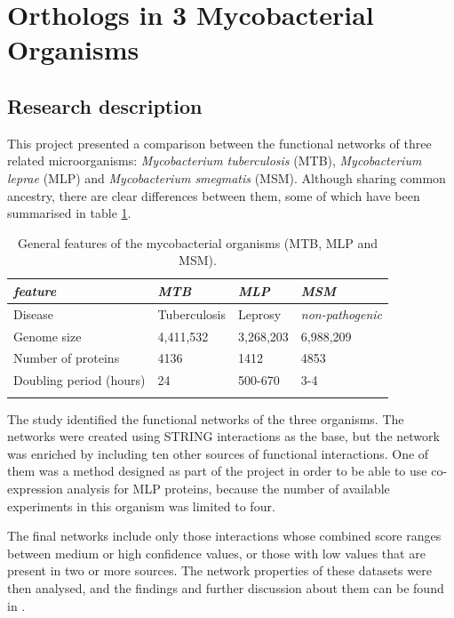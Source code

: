\section{Orthologs in 3 Mycobacterial Organisms}\label{sec:orthologs}
\subsection{Research description}
This project presented a comparison between the functional networks of three related microorganisms: \emph{Mycobacterium tuberculosis} (MTB), \emph{Mycobacterium leprae} (MLP) and \emph{Mycobacterium smegmatis} (MSM). Although sharing common ancestry, there are clear differences between them, some of which have been summarised in table \ref{tab:orthologs}.

\begin{table}[!ht]
\centering
        \begin{tabular}{| l | l | l | l |}
\hline \rowcolor{table_header}
\emph{feature} & \emph{MTB} & \emph{MLP} & \emph{MSM}\\
\hline \rowcolor{row_odd}
Disease & Tuberculosis & Leprosy & \emph{non-pathogenic}\\
\hline \rowcolor{row_even}
Genome size & 4,411,532 & 3,268,203 & 6,988,209\\
\hline \rowcolor{row_odd}
Number of proteins & 4136 & 1412 & 4853\\
\hline \rowcolor{row_even}
Doubling period (hours) & 24  & 500-670 & 3-4 \\
\hline \rowcolor{row_odd}
        \end{tabular}
        \caption{General features of the mycobacterial organisms (MTB, MLP and MSM).}
        \label{tab:orthologs}
\end{table}

The study identified the functional networks of the three organisms. The networks were created using STRING interactions as the base, but the network was enriched by including ten other sources of functional interactions. One of them was a method designed as part of the project in order to be able to use co-expression analysis for MLP proteins, because the number of available experiments in this organism was limited to four.

The final networks include only those interactions whose combined score ranges between medium or high confidence values, or those with low values that are present in two or more sources.  The network properties of these datasets were then analysed, and the findings and further discussion about them can be found in \cite{AKI2013}.

